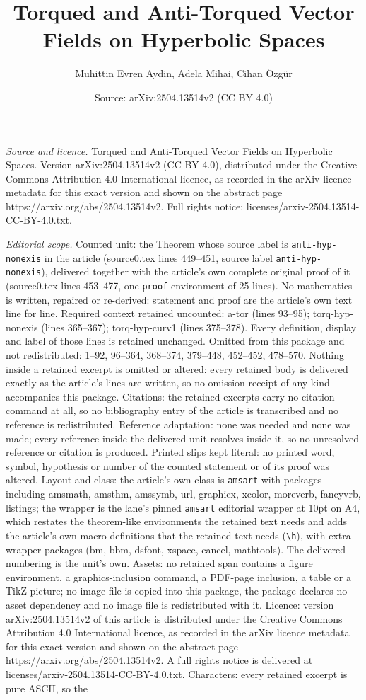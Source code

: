 \documentclass[10pt,a4paper]{amsart}
\title[Torqued and Anti-Torqued Vector Fields on Hyperbolic Spaces]{Torqued and Anti-Torqued Vector Fields on Hyperbolic Spaces}
\author{Muhittin Evren Aydin, Adela Mihai, Cihan \"Ozg\"ur}
\date{Source: arXiv:2504.13514v2 (CC BY 4.0)}
\begin{document}
\maketitle

\noindent\emph{Source and licence.} Torqued and Anti-Torqued Vector Fields on Hyperbolic Spaces. Version arXiv:2504.13514v2 (CC BY 4.0), distributed under the Creative Commons Attribution 4.0 International licence, as recorded in the arXiv licence metadata for this exact version and shown on the abstract page https://arxiv.org/abs/2504.13514v2. Full rights notice: licenses/arxiv-2504.13514-CC-BY-4.0.txt.\par\smallskip

\noindent\textit{Editorial scope.} Counted unit: the Theorem whose source label is \texttt{anti-hyp-nonexis} in the article (source0.tex lines 449--451, source label \texttt{anti-hyp-nonexis}), delivered together with the article's own complete original proof of it (source0.tex lines 453--477, one \texttt{proof} environment of 25 lines). No mathematics is written, repaired or re-derived: statement and proof are the article's own text line for line. Required context retained uncounted: a-tor (lines 93--95); torq-hyp-nonexis (lines 365--367); torq-hyp-curv1 (lines 375--378). Every definition, display and label of those lines is retained unchanged. Omitted from this package and not redistributed: 1--92, 96--364, 368--374, 379--448, 452--452, 478--570. Nothing inside a retained excerpt is omitted or altered: every retained body is delivered exactly as the article's lines are written, so no omission receipt of any kind accompanies this package. Citations: the retained excerpts carry no citation command at all, so no bibliography entry of the article is transcribed and no reference is redistributed. Reference adaptation: none was needed and none was made; every reference inside the delivered unit resolves inside it, so no unresolved reference or citation is produced. Printed slips kept literal: no printed word, symbol, hypothesis or number of the counted statement or of its proof was altered. Layout and class: the article's own class is \texttt{amsart} with packages including amsmath, amsthm, amssymb, url, graphicx, xcolor, moreverb, fancyvrb, listings; the wrapper is the lane's pinned \texttt{amsart} editorial wrapper at 10pt on A4, which restates the theorem-like environments the retained text needs and adds the article's own macro definitions that the retained text needs (\texttt{\textbackslash h}), with extra wrapper packages (bm, bbm, dsfont, xspace, cancel, mathtools). The delivered numbering is the unit's own. Assets: no retained span contains a figure environment, a graphics-inclusion command, a PDF-page inclusion, a table or a TikZ picture; no image file is copied into this package, the package declares no asset dependency and no image file is redistributed with it. Licence: version arXiv:2504.13514v2 of this article is distributed under the Creative Commons Attribution 4.0 International licence, as recorded in the arXiv licence metadata for this exact version and shown on the abstract page https://arxiv.org/abs/2504.13514v2. A full rights notice is delivered at licenses/arxiv-2504.13514-CC-BY-4.0.txt. Characters: every retained excerpt is pure ASCII, so the 
\end{document}
